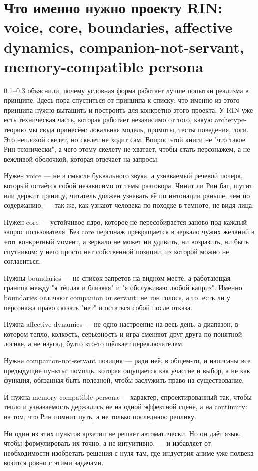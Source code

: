 \section{Что именно нужно проекту RIN: voice, core, boundaries, affective dynamics, companion-not-servant, memory-compatible persona}

0.1--0.3 объяснили, почему условная форма работает лучше попытки реализма в принципе. Здесь пора спуститься от принципа к списку: что именно из этого принципа нужно вытащить и построить для конкретно этого проекта. У RIN уже есть техническая часть, которая работает независимо от того, какую archetype-теорию мы сюда принесём: локальная модель, промпты, тесты поведения, логи. Это неплохой скелет, но скелет не ходит сам. Вопрос этой книги не "что такое Рин технически", а чего этому скелету не хватает, чтобы стать персонажем, а не вежливой оболочкой, которая отвечает на запросы.

Нужен voice — не в смысле буквального звука, а узнаваемый речевой почерк, который остаётся собой независимо от темы разговора. Чинит ли Рин баг, шутит или держит границу, читатель должен узнавать её по интонации раньше, чем по содержанию, — так же, как узнают человека по походке в темноте, не видя лица.

Нужен core — устойчивое ядро, которое не пересобирается заново под каждый запрос пользователя. Без core персонаж превращается в зеркало чужих желаний в этот конкретный момент, а зеркало не может ни удивить, ни возразить, ни быть спутником: у него просто нет собственной позиции, из которой можно не согласиться.

Нужны boundaries — не список запретов на видном месте, а работающая граница между "я тёплая и близкая" и "я обслуживаю любой каприз". Именно boundaries отличают companion от servant: не тон голоса, а то, есть ли у персонажа право сказать "нет" и остаться собой после отказа.

Нужна affective dynamics — не одно настроение на весь день, а диапазон, в котором тепло, колкость, серьёзность и игра сменяют друг друга по понятной логике, а не наугад, будто кто-то щёлкает переключателем.

Нужна companion-not-servant позиция — ради неё, в общем-то, и написаны все предыдущие пункты: помощь, которая ощущается как участие и выбор, а не как функция, обязанная быть полезной, чтобы заслужить право на существование.

И нужна memory-compatible persona — характер, спроектированный так, чтобы тепло и узнаваемость держались не на одной эффектной сцене, а на continuity: на том, что Рин помнит путь, а не только последнюю реплику.

Ни один из этих пунктов архетип не решает автоматически. Но он даёт язык, чтобы формулировать их точно, а не интуитивно, — и избавляет от необходимости изобретать решения с нуля там, где индустрия аниме уже полвека возится ровно с этими задачами.

